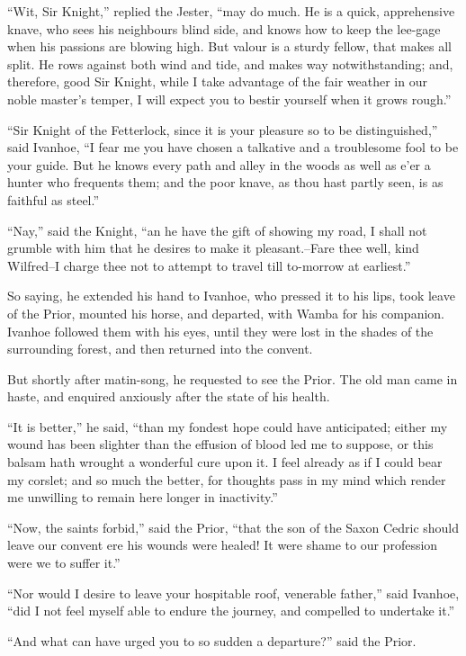 ``Wit, Sir Knight,'' replied the Jester, ``may do much. He is a quick,
apprehensive knave, who sees his neighbours blind side, and knows how to
keep the lee-gage when his passions are blowing high. But valour is a
sturdy fellow, that makes all split. He rows against both wind and tide,
and makes way notwithstanding; and, therefore, good Sir Knight, while I
take advantage of the fair weather in our noble master's temper, I will
expect you to bestir yourself when it grows rough.''

``Sir Knight of the Fetterlock, since it is your pleasure so to be
distinguished,'' said Ivanhoe, ``I fear me you have chosen a talkative
and a troublesome fool to be your guide. But he knows every path and
alley in the woods as well as e'er a hunter who frequents them; and the
poor knave, as thou hast partly seen, is as faithful as steel.''

``Nay,'' said the Knight, ``an he have the gift of showing my road, I
shall not grumble with him that he desires to make it pleasant.--Fare
thee well, kind Wilfred--I charge thee not to attempt to travel till
to-morrow at earliest.''

So saying, he extended his hand to Ivanhoe, who pressed it to his lips,
took leave of the Prior, mounted his horse, and departed, with Wamba for
his companion. Ivanhoe followed them with his eyes, until they were lost
in the shades of the surrounding forest, and then returned into the
convent.

But shortly after matin-song, he requested to see the Prior. The old man
came in haste, and enquired anxiously after the state of his health.

``It is better,'' he said, ``than my fondest hope could have
anticipated; either my wound has been slighter than the effusion of
blood led me to suppose, or this balsam hath wrought a wonderful cure
upon it. I feel already as if I could bear my corslet; and so much the
better, for thoughts pass in my mind which render me unwilling to remain
here longer in inactivity.''

``Now, the saints forbid,'' said the Prior, ``that the son of the Saxon
Cedric should leave our convent ere his wounds were healed! It were
shame to our profession were we to suffer it.''

``Nor would I desire to leave your hospitable roof, venerable father,''
said Ivanhoe, ``did I not feel myself able to endure the journey, and
compelled to undertake it.''

``And what can have urged you to so sudden a departure?'' said the
Prior.

